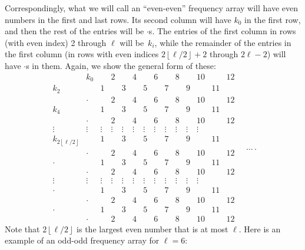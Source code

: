 \documentclass[pdftex]{sigma}
\numberwithin{equation}{section}
\theoremstyle{definition}
\begin{document}
Correspondingly, what we will call an ``even-even'' frequency array will have even numbers in the first and last rows. Its second column will have $k_0$ in the first row, and then the rest of the entries will be $\cdot$s. The entries of the first column in rows (with even index) 2 through $\ell$ will be~$k_i$, while the remainder of the entries in the first column (in rows with even indices $2\left\lfloor \ell/2\right\rfloor+2$ through $2\ell-2$) will have $\cdot$s in them. Again, we show the general form of these:
\begin{equation*}
\begin{matrix}
& k_0 && 2 && 4 && 6 && 8 && 10 && 12\\
k_2 && 1 && 3 && 5 && 7 && 9 && 11 & \\
& \cdot && 2 && 4 && 6 && 8 && 10 && 12\\
k_4 && 1 && 3 && 5 && 7 && 9 && 11 & \\
& \cdot && 2 && 4 && 6 && 8 && 10 && 12\\
\vdots & \vdots &\vdots& \vdots &\vdots& \vdots &\vdots& \vdots &\vdots& \vdots &\vdots& \vdots\\
k_{2\left\lfloor \ell/2\right\rfloor} && 1 && 3 && 5 && 7 && 9 && 11 & \\
& \cdot && 2 && 4 && 6 && 8 && 10 && 12\\
\cdot && 1 && 3 && 5 && 7 && 9 && 11 & \\
& \cdot && 2 && 4 && 6 && 8 && 10 && 12\\
\vdots & \vdots &\vdots& \vdots &\vdots& \vdots &\vdots& \vdots &\vdots& \vdots &\vdots& \vdots\\
\cdot && 1 && 3 && 5 && 7 && 9 && 11 & \\
& \cdot && 2 && 4 && 6 && 8 && 10 && 12 \\
\cdot && 1 && 3 && 5 && 7 && 9 && 11 & \\
& \cdot && 2 && 4 && 6 && 8 && 10 && 12
 \end{matrix}\quad\dots \,.
\end{equation*}
Note that $2\left\lfloor \ell/2\right\rfloor$ is the largest even number that is at most $\ell$. Here is an example of an odd-odd frequency array for $\ell=6$:
\end{document}
